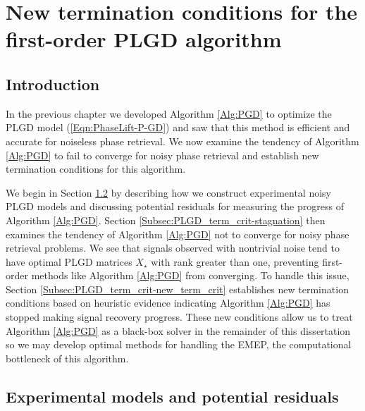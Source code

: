 \chapter{New termination conditions for the first-order PLGD algorithm}  \label{Sec:PLGD_term_crit}


\section{Introduction}	\label{Subsec:PLGD_term_crit-intro}


In the previous chapter we developed Algorithm \ref{Alg:PGD} to optimize the PLGD model (\ref{Eqn:PhaseLift-P-GD}) and saw that this method is efficient and accurate for noiseless phase retrieval.  We now examine the tendency of Algorithm \ref{Alg:PGD} to fail to converge for noisy phase retrieval and establish new termination conditions for this algorithm.

We begin in Section \ref{Subsec:PLGD_term_crit-NOISY_MODELS_AND_RESIDUALS} by describing how we construct experimental noisy PLGD models and discussing potential residuals for measuring the progress of Algorithm \ref{Alg:PGD}.
Section \ref{Subsec:PLGD_term_crit-stagnation} then examines the tendency of Algorithm \ref{Alg:PGD} not to converge for noisy phase retrieval problems.
We see that signals observed with nontrivial noise tend to have optimal PLGD matrices $X_\star$ with rank greater than one, preventing first-order methods like Algorithm \ref{Alg:PGD} from converging.  
To handle this issue, Section \ref{Subsec:PLGD_term_crit-new_term_crit} establishes new termination conditions based on heuristic evidence indicating Algorithm \ref{Alg:PGD} has stopped making signal recovery progress.  
These new conditions allow us to treat Algorithm \ref{Alg:PGD} as a black-box solver in the remainder of this dissertation so we may develop optimal methods for handling the EMEP, the computational bottleneck of this algorithm.







\section{Experimental models and potential residuals} 		\label{Subsec:PLGD_term_crit-NOISY_MODELS_AND_RESIDUALS}



